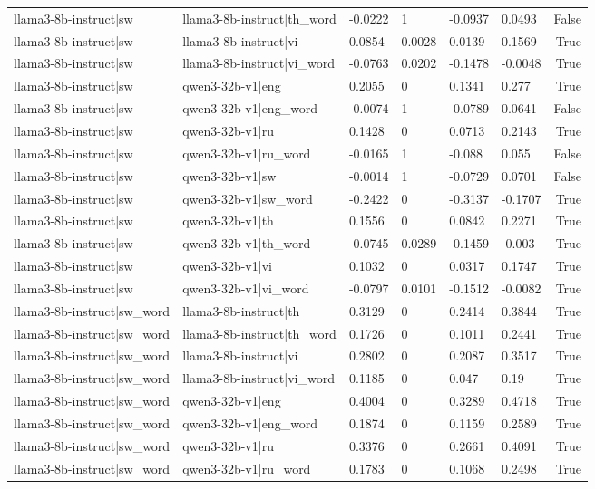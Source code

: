 \begin{table}
\begin{tabular}{llllllr}
llama3-8b-instruct|sw & llama3-8b-instruct|th_word & -0.0222 & 1 & -0.0937 & 0.0493 & False \\
llama3-8b-instruct|sw & llama3-8b-instruct|vi & 0.0854 & 0.0028 & 0.0139 & 0.1569 & True \\
llama3-8b-instruct|sw & llama3-8b-instruct|vi_word & -0.0763 & 0.0202 & -0.1478 & -0.0048 & True \\
llama3-8b-instruct|sw & qwen3-32b-v1|eng & 0.2055 & 0 & 0.1341 & 0.277 & True \\
llama3-8b-instruct|sw & qwen3-32b-v1|eng_word & -0.0074 & 1 & -0.0789 & 0.0641 & False \\
llama3-8b-instruct|sw & qwen3-32b-v1|ru & 0.1428 & 0 & 0.0713 & 0.2143 & True \\
llama3-8b-instruct|sw & qwen3-32b-v1|ru_word & -0.0165 & 1 & -0.088 & 0.055 & False \\
llama3-8b-instruct|sw & qwen3-32b-v1|sw & -0.0014 & 1 & -0.0729 & 0.0701 & False \\
llama3-8b-instruct|sw & qwen3-32b-v1|sw_word & -0.2422 & 0 & -0.3137 & -0.1707 & True \\
llama3-8b-instruct|sw & qwen3-32b-v1|th & 0.1556 & 0 & 0.0842 & 0.2271 & True \\
llama3-8b-instruct|sw & qwen3-32b-v1|th_word & -0.0745 & 0.0289 & -0.1459 & -0.003 & True \\
llama3-8b-instruct|sw & qwen3-32b-v1|vi & 0.1032 & 0 & 0.0317 & 0.1747 & True \\
llama3-8b-instruct|sw & qwen3-32b-v1|vi_word & -0.0797 & 0.0101 & -0.1512 & -0.0082 & True \\
llama3-8b-instruct|sw_word & llama3-8b-instruct|th & 0.3129 & 0 & 0.2414 & 0.3844 & True \\
llama3-8b-instruct|sw_word & llama3-8b-instruct|th_word & 0.1726 & 0 & 0.1011 & 0.2441 & True \\
llama3-8b-instruct|sw_word & llama3-8b-instruct|vi & 0.2802 & 0 & 0.2087 & 0.3517 & True \\
llama3-8b-instruct|sw_word & llama3-8b-instruct|vi_word & 0.1185 & 0 & 0.047 & 0.19 & True \\
llama3-8b-instruct|sw_word & qwen3-32b-v1|eng & 0.4004 & 0 & 0.3289 & 0.4718 & True \\
llama3-8b-instruct|sw_word & qwen3-32b-v1|eng_word & 0.1874 & 0 & 0.1159 & 0.2589 & True \\
llama3-8b-instruct|sw_word & qwen3-32b-v1|ru & 0.3376 & 0 & 0.2661 & 0.4091 & True \\
llama3-8b-instruct|sw_word & qwen3-32b-v1|ru_word & 0.1783 & 0 & 0.1068 & 0.2498 & True \\

\end{tabular}
\end{table}
